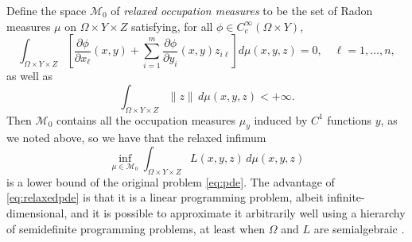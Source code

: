 \documentclass{article}
\theoremstyle{definition}
\theoremstyle{remark}
\begin{document}
Define the space $\mathcal M_0$ of \emph{relaxed occupation measures} to be the set of Radon measures $\mu$ on $\Omega\times Y\times Z$ satisfying, for all $\phi\in C^\infty_c(\Omega\times Y)$,
\begin{equation}\label{eq:closed}
 \int_{\Omega\times Y\times Z}\left[\frac{\partial\phi}{\partial x_\ell}(x,y)+\sum_{i=1}^m\frac{\partial\phi}{\partial y_i}(x,y)z_{i\ell}\right]d\mu(x,y,z)=0,\quad \ell=1,\dots,n,
\end{equation}
as well as
\begin{equation}\label{eq:finitemoments}
 \int_{\Omega\times Y\times Z} \|z\|\,d\mu(x,y,z)<+\infty.
\end{equation}
Then $\mathcal M_0$ contains all the occupation measures $\mu_y$ induced by $C^1$ functions $y$, as we noted above, so we have that the relaxed infimum
\begin{equation}\label{eq:relaxedpde}
 \inf_{\mu\in \mathcal M_0}\int_{\Omega\times Y\times Z}L(x,y,z)\,d\mu(x,y,z)
\end{equation}
is a lower bound of the original problem \eqref{eq:pde}. The advantage of \eqref{eq:relaxedpde} is that it is a linear programming problem, albeit infinite-dimensional, and it is possible to approximate it arbitrarily well using a hierarchy of semidefinite programming problems, at least when $\Omega$ and $L$ are semialgebraic \cite{korda2018moments}. 
\end{document}
